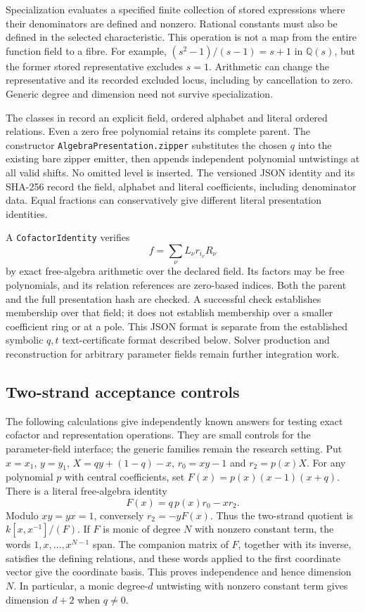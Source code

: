 \documentclass[11pt]{article}
\newcommand{\Q}{\mathbb Q}
\begin{document}
Specialization evaluates a specified finite collection of stored expressions
where their denominators are defined and nonzero. Rational constants must also
be defined in the selected characteristic. This operation is not a map from
the entire function field to a fibre. For example, $(s^2-1)/(s-1)=s+1$ in
$\Q(s)$, but the former stored representative excludes $s=1$. Arithmetic can
change the representative and its recorded excluded locus, including by
cancellation to zero. Generic degree and dimension need not survive specialization.

The classes in  record an explicit field,
ordered alphabet and literal ordered relations. Even a zero free polynomial
retains its complete parent. The constructor
\texttt{AlgebraPresentation.zipper} substitutes the chosen $q$ into the existing
bare zipper emitter, then appends independent polynomial untwistings at all
valid shifts. No omitted level is inserted. The versioned JSON identity and
its SHA-256 record the field, alphabet and literal coefficients, including
denominator data. Equal fractions can conservatively give different literal
presentation identities.

A \texttt{CofactorIdentity} verifies
\[
 f=\sum_\nu L_\nu r_{i_\nu}R_\nu
\]
by exact free-algebra arithmetic over the declared field. Its factors may be
free polynomials, and its relation references are zero-based indices. Both
the parent and the full presentation hash are checked. A successful check
establishes membership over that field; it does not establish membership over
a smaller coefficient ring or at a pole. This JSON format is separate from
the established symbolic $q,t$ text-certificate format described below. Solver
production and reconstruction for arbitrary parameter fields remain further
integration work.

\subsection{Two-strand acceptance controls}
The following calculations give independently known answers for testing exact
cofactor and representation operations. They are small controls for the
parameter-field interface; the generic families remain the research setting.
Put $x=x_1$, $y=y_1$, $X=qy+(1-q)-x$, $r_0=xy-1$ and
$r_2=p(x)X$. For any polynomial $p$ with central coefficients, set
$F(x)=p(x)(x-1)(x+q)$. There is a literal free-algebra identity
\[
 F(x)=q\,p(x)r_0-xr_2.
\]
Modulo $xy=yx=1$, conversely $r_2=-yF(x)$. Thus the two-strand quotient is
$k[x,x^{-1}]/(F)$. If $F$ is monic of degree $N$ with nonzero constant term,
the words $1,x,\ldots,x^{N-1}$ span. The companion matrix of $F$, together with
its inverse, satisfies the defining relations, and these words applied to the
first coordinate vector give the coordinate basis. This proves independence
and hence dimension $N$. In particular, a monic degree-$d$ untwisting with
nonzero constant term gives dimension $d+2$ when $q\ne0$.
\end{document}

